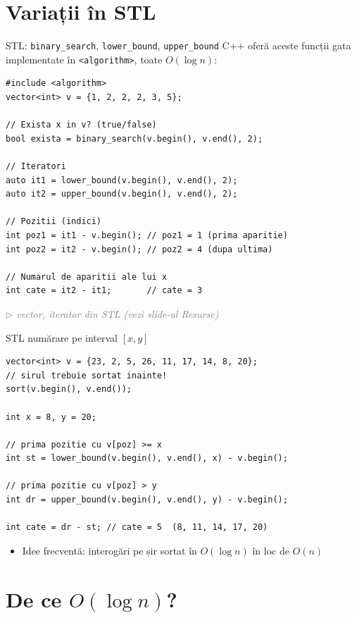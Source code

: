 \documentclass{beamer}
\newcommand{\beginnote}[1]{%
  \vfill
  {\footnotesize\textcolor{gray}{\textit{$\triangleright$ #1 (vezi slide-ul \emph{Resurse})}}}%
}
\begin{document}
\section{Variații în STL}

\begin{frame}{STL: \texttt{binary\_search}, \texttt{lower\_bound}, \texttt{upper\_bound}}
  C++ oferă aceste funcții gata implementate în \lstinline|<algorithm>|, toate $O(\log n)$:
  \begin{lstlisting}
#include <algorithm>
vector<int> v = {1, 2, 2, 2, 3, 5};

// Exista x in v? (true/false)
bool exista = binary_search(v.begin(), v.end(), 2);

// Iteratori
auto it1 = lower_bound(v.begin(), v.end(), 2);
auto it2 = upper_bound(v.begin(), v.end(), 2);

// Pozitii (indici)
int poz1 = it1 - v.begin(); // poz1 = 1 (prima aparitie)
int poz2 = it2 - v.begin(); // poz2 = 4 (dupa ultima)

// Numarul de aparitii ale lui x
int cate = it2 - it1;       // cate = 3
  \end{lstlisting}
  \beginnote{vector, iterator \textemdash{} din STL}
\end{frame}

\begin{frame}[fragile]{STL \textemdash{} numărare pe interval $[x, y]$}
  \begin{lstlisting}
vector<int> v = {23, 2, 5, 26, 11, 17, 14, 8, 20};
// sirul trebuie sortat inainte!
sort(v.begin(), v.end());

int x = 8, y = 20;

// prima pozitie cu v[poz] >= x
int st = lower_bound(v.begin(), v.end(), x) - v.begin();

// prima pozitie cu v[poz] > y
int dr = upper_bound(v.begin(), v.end(), y) - v.begin();

int cate = dr - st; // cate = 5  (8, 11, 14, 17, 20)
  \end{lstlisting}
  \begin{itemize}
    \item Idee frecventă: interogări pe șir sortat în $O(\log n)$ în loc de $O(n)$
  \end{itemize}
\end{frame}

\section{De ce $O(\log n)$?}
\end{document}
